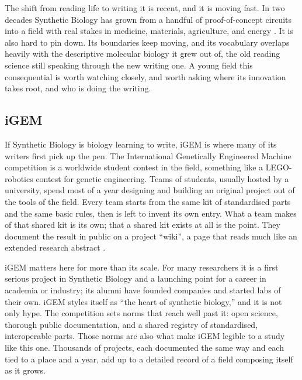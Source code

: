 \documentclass[12pt,a4paper]{article}
\begin{document}
	The shift from reading life to writing it is recent, and it is moving fast. In two
	decades Synthetic Biology has grown from a handful of proof-of-concept circuits into
	a field with real stakes in medicine, materials, agriculture, and energy
	\citep{shapiraTrackingEmergenceSynthetic2017, raimbaultMappingEmergenceSynthetic2016}.
	It is also hard to pin down. Its boundaries keep moving, and its vocabulary overlaps
	heavily with the descriptive molecular biology it grew out of, the old reading
	science still speaking through the new writing one. A young field this consequential
	is worth watching closely, and worth asking where its innovation takes root, and who
	is doing the writing.
	
	\subsection{iGEM}
	
	If Synthetic Biology is biology learning to write, iGEM is where many of its writers
	first pick up the pen. The International Genetically Engineered Machine competition
	is a worldwide student contest in the field, something like a LEGO-robotics contest
	for genetic engineering. Teams of students, usually hosted by a university, spend
	most of a year designing and building an original project out of the tools of the
	field. Every team starts from the same kit of standardised parts and the same basic
	rules, then is left to invent its own entry. What a team makes of that shared kit is
	its own; that a shared kit exists at all is the point. They document the result in
	public on a project ``wiki'', a page that reads much like an extended research
	abstract \citep{santoliniIGEMModelSystem2023}.
	
	iGEM matters here for more than its scale. For many researchers it is a first serious
	project in Synthetic Biology and a launching point for a career in academia or
	industry; its alumni have founded companies and started labs of their own. iGEM
	styles itself as ``the heart of synthetic biology,'' and it is not only hype. The
	competition sets norms that reach well past it: open science, thorough public
	documentation, and a shared registry of standardised, interoperable parts. Those
	norms are also what make iGEM legible to a study like this one. Thousands of
	projects, each documented the same way and each tied to a place and a year, add up
	to a detailed record of a field composing itself as it grows.
	
\end{document}
